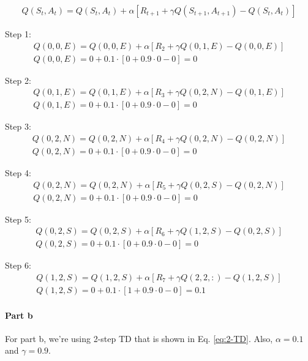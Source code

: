 \documentclass[12pt]{article}
\begin{document}
\begin{gather}
  Q(S_t, A_t) = Q(S_t, A_t) + \alpha [R_{t+1} + \gamma Q(S_{t+1}, A_{t+1}) - Q(S_t, A_t)] \label{eq:1-TD}
\end{gather}

Step 1:
\begin{gather*}
  Q(0, 0, E) = Q(0, 0, E) + \alpha [R_2 + \gamma Q(0, 1, E) - Q(0, 0, E)] \\
  Q(0, 0, E) = 0 + 0.1 \cdot [0 + 0.9 \cdot 0 - 0] = 0
\end{gather*}

Step 2:
\begin{gather*}
  Q(0, 1, E) = Q(0, 1, E) + \alpha [R_3 + \gamma Q(0, 2, N) - Q(0, 1, E)] \\
  Q(0, 1, E) = 0 + 0.1 \cdot [0 + 0.9 \cdot 0 - 0] = 0
\end{gather*}

Step 3:
\begin{gather*}
  Q(0, 2, N) = Q(0, 2, N) + \alpha [R_4 + \gamma Q(0, 2, N) - Q(0, 2, N)] \\
  Q(0, 2, N) = 0 + 0.1 \cdot [0 + 0.9 \cdot 0 - 0] = 0
\end{gather*}

Step 4:
\begin{gather*}
  Q(0, 2, N) = Q(0, 2, N) + \alpha [R_5 + \gamma Q(0, 2, S) - Q(0, 2, N)] \\
  Q(0, 2, N) = 0 + 0.1 \cdot [0 + 0.9 \cdot 0 - 0] = 0
\end{gather*}

Step 5:
\begin{gather*}
  Q(0, 2, S) = Q(0, 2, S) + \alpha [R_6 + \gamma Q(1, 2, S) - Q(0, 2, S)] \\
  Q(0, 2, S) = 0 + 0.1 \cdot [0 + 0.9 \cdot 0 - 0] = 0
\end{gather*}

Step 6:
\begin{gather*}
  Q(1, 2, S) = Q(1, 2, S) + \alpha [R_7 + \gamma Q(2, 2, :) - Q(1, 2, S)] \\
  Q(1, 2, S) = 0 + 0.1 \cdot [1 + 0.9 \cdot 0 - 0] = 0.1
\end{gather*}

\paragraph{Part b}

For part b, we're using 2-step TD that is shown in Eq. \ref{eq:2-TD}. Also, $\alpha = 0.1$ and $\gamma = 0.9$.
\end{document}
